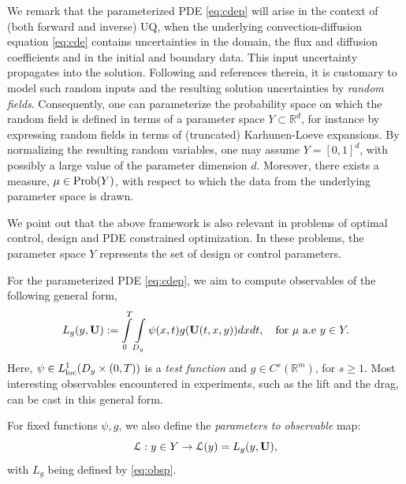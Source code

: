 \documentclass[a4paper]{article}
\numberwithin{equation}{section}
\numberwithin{equation}{section}
\theoremstyle{definition}
\theoremstyle{myremarkstyle}
\renewcommand{\geq}{\geqslant}
\newcommand{\R}{\mathbb{R}}
\newcommand{\U}{{\bf U}}		%
\newcommand{\map}{\EuScript{L}}
\begin{document}
We remark that the parameterized PDE \eqref{eq:cdep} will arise in the context of (both forward and inverse) UQ, when the underlying convection-diffusion equation \eqref{eq:cde} contains uncertainties in the domain, the flux and diffusion coefficients and in the initial and boundary data. This input uncertainty propagates into the solution. Following \cite{UQbook} and references therein, it is customary to model such random inputs and the resulting solution uncertainties by \emph{random fields}. Consequently, one can parameterize the probability space on which the random field is defined in terms of a parameter space $Y \subset \R^{d}$, for instance by expressing random fields in terms of (truncated) Karhunen-Loeve expansions. By normalizing the resulting random variables, one may assume $Y = [0,1]^{d}$, with possibly a large value of the parameter dimension $d$. Moreover, there exists a measure, $\mu \in {\rm Prob}(Y)$, with respect to which the data from the underlying parameter space is drawn.

We point out that the above framework is also relevant in problems of optimal control, design and PDE constrained optimization. In these problems, the parameter space $Y$ represents the set of design or control parameters. 

For the parameterized PDE \eqref{eq:cdep}, we aim to compute observables of the following general form,
\begin{equation}
\label{eq:obsp}
L_g(y,\U) := \int\limits_0^T\int\limits_{D_y} \psi(x,t) g(\U(t,x,y)) dx dt, \quad {\rm for} ~\mu~{\rm a.e}~y \in Y.
\end{equation} 
Here, $\psi \in L^1_{{\rm loc}} (D_y \times (0,T))$ is a  \emph{test function} and $g \in C^s(\R^m)$, for $s \geq 1$. Most interesting observables encountered in experiments, such as the lift and the drag, can be cast in this general form. 

For fixed functions $\psi,g$, we also define the \emph{parameters to observable} map:
\begin{equation}
\label{eq:ptoob}
\map:y \in Y \rightarrow \map(y) = L_g(y,\U),
\end{equation}
with $L_g$ being defined by \eqref{eq:obsp}. 
\end{document}
